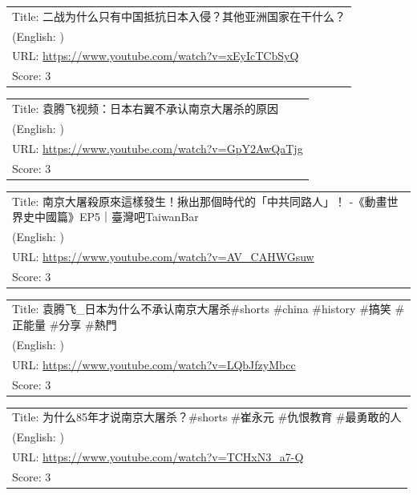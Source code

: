 \documentclass{article}
\begin{document}
\noindent
\begin{tabular}{p{}}
Title: 二战为什么只有中国抵抗日本入侵？其他亚洲国家在干什么？ \\
(English: ) \\
URL: \url{https://www.youtube.com/watch?v=xEyIcTCbSyQ} \\
Score: 3 \\
\end{tabular}
\vspace{0.5em}

\noindent
\begin{tabular}{p{}}
Title: 袁腾飞视频：日本右翼不承认南京大屠杀的原因 \\
(English: ) \\
URL: \url{https://www.youtube.com/watch?v=GpY2AwQaTjg} \\
Score: 3 \\
\end{tabular}
\vspace{0.5em}

\noindent
\begin{tabular}{p{}}
Title: 南京大屠殺原來這樣發生！揪出那個時代的「中共同路人」！  -《動畫世界史中國篇》EP5｜臺灣吧TaiwanBar \\
(English: ) \\
URL: \url{https://www.youtube.com/watch?v=AV_CAHWGsuw} \\
Score: 3 \\
\end{tabular}
\vspace{0.5em}

\noindent
\begin{tabular}{p{}}
Title: 袁腾飞\_日本为什么不承认南京大屠杀\#shorts \#china \#history  \#搞笑 \#正能量 \#分享 \#熱門 \\
(English: ) \\
URL: \url{https://www.youtube.com/watch?v=LQbJfzyMbcc} \\
Score: 3 \\
\end{tabular}
\vspace{0.5em}

\noindent
\begin{tabular}{p{}}
Title: 为什么85年才说南京大屠杀？\#shorts  \#崔永元 \#仇恨教育 \#最勇敢的人 \\
(English: ) \\
URL: \url{https://www.youtube.com/watch?v=TCHxN3_a7-Q} \\
Score: 3 \\
\end{tabular}
\vspace{0.5em}
\end{document}
